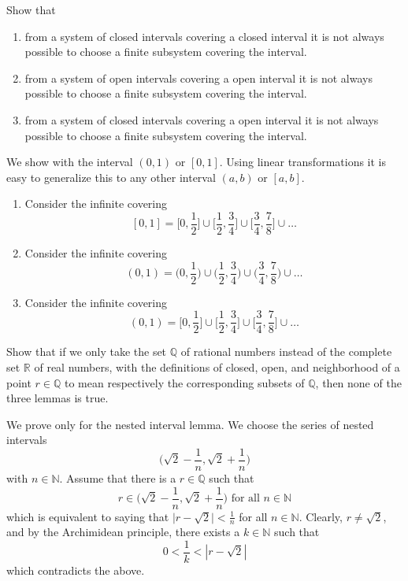   \begin{exercise}[Zorich 2.3.2]
    Show that 
    \begin{enumerate}
      \item from a system of closed intervals covering a closed interval it is not always possible to choose a finite subsystem covering the interval. 
      \item from a system of open intervals covering a open interval it is not always possible to choose a finite subsystem covering the interval. 
      \item from a system of closed intervals covering a open interval it is not always possible to choose a finite subsystem covering the interval. 
    \end{enumerate}
  \end{exercise}
  \begin{solution}
    We show with the interval $(0, 1)$ or $[0, 1]$. Using linear transformations it is easy to generalize this to any other interval $(a, b)$ or $[a, b]$. 
    \begin{enumerate}
      \item Consider the infinite covering
      \[[0, 1] = \big[0, \frac{1}{2}\big] \cup \big[\frac{1}{2}, \frac{3}{4}\big] \cup \big[\frac{3}{4}, \frac{7}{8}\big] \cup \ldots \]
      \item Consider the infinite covering 
      \[(0, 1) = \big(0, \frac{1}{2}\big) \cup \big(\frac{1}{2}, \frac{3}{4}\big) \cup \big(\frac{3}{4}, \frac{7}{8}\big) \cup \ldots \]
      \item Consider the infinite covering 
      \[(0, 1) = \big[0, \frac{1}{2}\big] \cup \big[\frac{1}{2}, \frac{3}{4}\big] \cup \big[\frac{3}{4}, \frac{7}{8}\big] \cup \ldots \]
    \end{enumerate}
  \end{solution}

  \begin{exercise}[Zorich 2.3.3]
    Show that if we only take the set $\mathbb{Q}$ of rational numbers instead of the complete set $\mathbb{R}$ of real numbers, with the definitions of closed, open, and neighborhood of a point $r \in \mathbb{Q}$ to mean respectively the corresponding subsets of $\mathbb{Q}$, then none of the three lemmas is true. 
  \end{exercise}
  \begin{solution}
    We prove only for the nested interval lemma. We choose the series of nested intervals 
    \[\bigg( \sqrt{2} - \frac{1}{n}, \sqrt{2} + \frac{1}{n} \bigg)\]
    with $n \in \mathbb{N}$. Assume that there is a $r \in \mathbb{Q}$ such that 
    \[r \in \bigg( \sqrt{2} - \frac{1}{n}, \sqrt{2} + \frac{1}{n} \bigg) \text{ for all } n \in \mathbb{N}\]
    which is equivalent to saying that $\big| r - \sqrt{2}\big| < \frac{1}{n}$ for all $n \in \mathbb{N}$. Clearly, $r \neq \sqrt{2}$, and by the Archimidean principle, there exists a $k \in \mathbb{N}$ such that 
    \[0 < \frac{1}{k} < |r - \sqrt{2}|\]
    which contradicts the above. 
  \end{solution}

